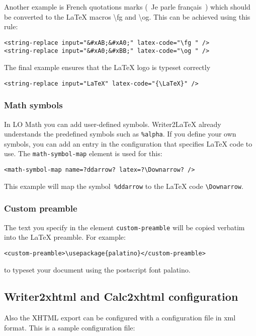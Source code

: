 \documentclass{article}
\newcommand\textstyleSourceText[1]{\texttt{\textmd{#1}}}
\begin{document}
{\mdseries
Another example is French quotations marks ({\guillemotleft}~Je parle fran\c{c}ais~{\guillemotright}) which should be converted to the LaTeX macros {\textbackslash}fg and {\textbackslash}og. This can be achieved using this rule:}

\begin{verbatim}
<string-replace input="&#xAB;&#xA0;" latex-code="\fg " />
<string-replace input="&#xA0;&#xBB;" latex-code="\og " />
\end{verbatim}
{\mdseries
The final example ensures that the LaTeX logo is typeset correctly}

\begin{verbatim}
<string-replace input="LaTeX" latex-code="{\LaTeX}" />
\end{verbatim}
\subsubsection{Math symbols}
{\mdseries
In LO Math you can add user-defined symbols. Writer2LaTeX already understands the predefined symbols such as \textstyleSourceText{\%alpha}. If you define your own symbols, you can add an entry in the configuration that specifies LaTeX code to use. The \textstyleSourceText{math-symbol-map} element is used for this:}

\begin{verbatim}
<math-symbol-map name=?ddarrow? latex=?\Downarrow? />
\end{verbatim}
{\mdseries
This example will map the symbol\textstyleSourceText{ \%ddarrow} to the LaTeX code \textstyleSourceText{{\textbackslash}Downarrow}.}

\subsubsection{Custom preamble}
{\mdseries
The text you specify in the element \textstyleSourceText{custom-preamble} will be copied verbatim into the LaTeX preamble. For example:}

\begin{verbatim}
<custom-preamble>\usepackage{palatino}</custom-preamble>
\end{verbatim}
{\mdseries
to typeset your document using the postscript font palatino.}

\subsection{Writer2xhtml and Calc2xhtml configuration}
{\mdseries
Also the XHTML export can be configured with a configuration file in xml format. This is a sample configuration file:}
\end{document}
